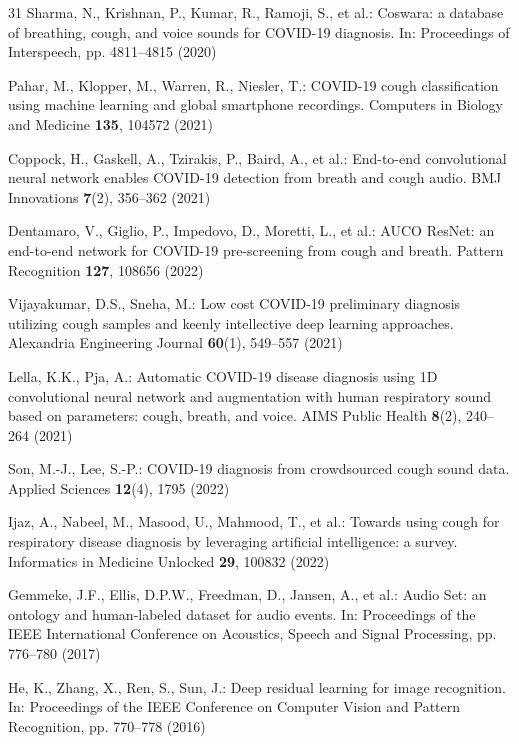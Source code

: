 \documentclass[pdflatex,sn-mathphys-num]{sn-jnl}
\begin{document}
\begin{thebibliography}{31}
Sharma, N., Krishnan, P., Kumar, R., Ramoji, S., et al.: Coswara: a database
of breathing, cough, and voice sounds for COVID-19 diagnosis. In: Proceedings
of Interspeech, pp. 4811--4815 (2020)

Pahar, M., Klopper, M., Warren, R., Niesler, T.: COVID-19 cough
classification using machine learning and global smartphone recordings.
Computers in Biology and Medicine \textbf{135}, 104572 (2021)

Coppock, H., Gaskell, A., Tzirakis, P., Baird, A., et al.: End-to-end
convolutional neural network enables COVID-19 detection from breath and cough
audio. BMJ Innovations \textbf{7}(2), 356--362 (2021)

Dentamaro, V., Giglio, P., Impedovo, D., Moretti, L., et al.: AUCO ResNet: an
end-to-end network for COVID-19 pre-screening from cough and breath. Pattern
Recognition \textbf{127}, 108656 (2022)

Vijayakumar, D.S., Sneha, M.: Low cost COVID-19 preliminary diagnosis
utilizing cough samples and keenly intellective deep learning approaches.
Alexandria Engineering Journal \textbf{60}(1), 549--557 (2021)

Lella, K.K., Pja, A.: Automatic COVID-19 disease diagnosis using 1D
convolutional neural network and augmentation with human respiratory sound
based on parameters: cough, breath, and voice. AIMS Public Health
\textbf{8}(2), 240--264 (2021)

Son, M.-J., Lee, S.-P.: COVID-19 diagnosis from crowdsourced cough sound data.
Applied Sciences \textbf{12}(4), 1795 (2022)

Ijaz, A., Nabeel, M., Masood, U., Mahmood, T., et al.: Towards using cough for
respiratory disease diagnosis by leveraging artificial intelligence: a survey.
Informatics in Medicine Unlocked \textbf{29}, 100832 (2022)

Gemmeke, J.F., Ellis, D.P.W., Freedman, D., Jansen, A., et al.: Audio Set: an
ontology and human-labeled dataset for audio events. In: Proceedings of the
IEEE International Conference on Acoustics, Speech and Signal Processing,
pp. 776--780 (2017)

He, K., Zhang, X., Ren, S., Sun, J.: Deep residual learning for image
recognition. In: Proceedings of the IEEE Conference on Computer Vision and
Pattern Recognition, pp. 770--778 (2016)


\end{thebibliography}
\end{document}
